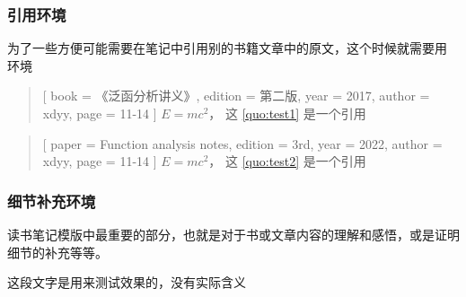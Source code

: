 \documentclass{xdyy-usermanual}
\begin{document}
\subsubsection{ 引用环境  }

为了一些方便可能需要在笔记中引用别的书籍文章中的原文，这个时候就需要用  环境

\begin{vexample}
    \begin{quotation}[
      book    = {《泛函分析讲义》},      %
      edition = {第二版},                %
      year    = {2017},                  %
      author  = {xdyy},                  %
      page    = {11-14}                  %
    ]\label{quo:test1}
      $E = m c^2$， 这 \ref{quo:test1} 是一个引用
    \end{quotation}
\end{vexample}

\begin{vexample}
    \begin{quotation}[
      paper   = {Function analysis notes},   %
      edition = {3rd},                       %
      year    = {2022},                      %
      author  = {xdyy},                      %
      page    = {11-14}                      %
    ]\label{quo:test2}
      $E = m c^2$， 这 \ref{quo:test2} 是一个引用
    \end{quotation}
\end{vexample}



\subsubsection{ 细节补充环境  }

读书笔记模版中最重要的部分，也就是对于书或文章内容的理解和感悟，或是证明细节的补充等等。


\begin{vexample}
    \begin{detail}[
      paper   = {Function analysis notes},   %
      page = {103},                          %
      author = {许全华},                     %
      edition = {第一版},                    %
      year = {2017},                         %
      line = {倒数第三行},                   %
      original = {                           %
        ...
      }
    ]
      这段文字是用来测试效果的，没有实际含义
    \end{detail}
\end{vexample}
\end{document}
